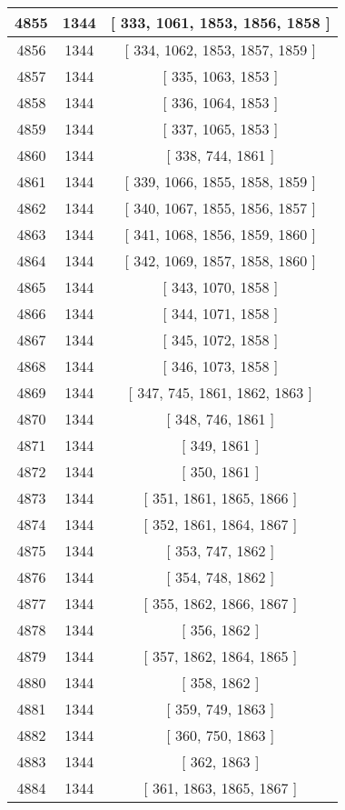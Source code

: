 \begin{center}
\begin{longtable}[H]{|| c c c ||}
\hline
4855 & 1344 & [ 333, 1061, 1853, 1856, 1858 ] \\ 
\hline
4856 & 1344 & [ 334, 1062, 1853, 1857, 1859 ] \\ 
\hline
4857 & 1344 & [ 335, 1063, 1853 ] \\ 
\hline
4858 & 1344 & [ 336, 1064, 1853 ] \\ 
\hline
4859 & 1344 & [ 337, 1065, 1853 ] \\ 
\hline
4860 & 1344 & [ 338, 744, 1861 ] \\ 
\hline
4861 & 1344 & [ 339, 1066, 1855, 1858, 1859 ] \\ 
\hline
4862 & 1344 & [ 340, 1067, 1855, 1856, 1857 ] \\ 
\hline
4863 & 1344 & [ 341, 1068, 1856, 1859, 1860 ] \\ 
\hline
4864 & 1344 & [ 342, 1069, 1857, 1858, 1860 ] \\ 
\hline
4865 & 1344 & [ 343, 1070, 1858 ] \\ 
\hline
4866 & 1344 & [ 344, 1071, 1858 ] \\ 
\hline
4867 & 1344 & [ 345, 1072, 1858 ] \\ 
\hline
4868 & 1344 & [ 346, 1073, 1858 ] \\ 
\hline
4869 & 1344 & [ 347, 745, 1861, 1862, 1863 ] \\ 
\hline
4870 & 1344 & [ 348, 746, 1861 ] \\ 
\hline
4871 & 1344 & [ 349, 1861 ] \\ 
\hline
4872 & 1344 & [ 350, 1861 ] \\ 
\hline
4873 & 1344 & [ 351, 1861, 1865, 1866 ] \\ 
\hline
4874 & 1344 & [ 352, 1861, 1864, 1867 ] \\ 
\hline
4875 & 1344 & [ 353, 747, 1862 ] \\ 
\hline
4876 & 1344 & [ 354, 748, 1862 ] \\ 
\hline
4877 & 1344 & [ 355, 1862, 1866, 1867 ] \\ 
\hline
4878 & 1344 & [ 356, 1862 ] \\ 
\hline
4879 & 1344 & [ 357, 1862, 1864, 1865 ] \\ 
\hline
4880 & 1344 & [ 358, 1862 ] \\ 
\hline
4881 & 1344 & [ 359, 749, 1863 ] \\ 
\hline
4882 & 1344 & [ 360, 750, 1863 ] \\ 
\hline
4883 & 1344 & [ 362, 1863 ] \\ 
\hline
4884 & 1344 & [ 361, 1863, 1865, 1867 ] \\ 

\end{longtable}
\end{center}
